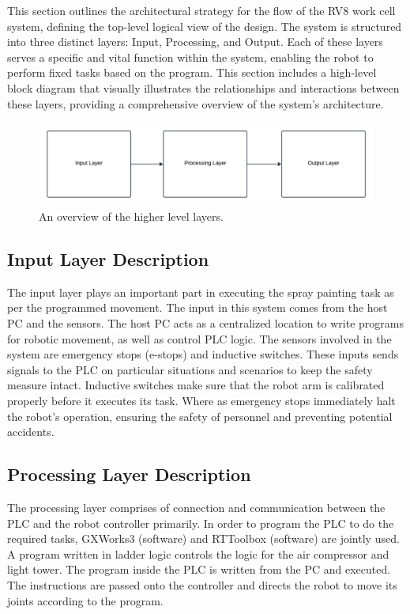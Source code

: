 This section outlines the architectural strategy for the flow of the RV8 work cell system, defining the top-level logical view of the design. The system is structured into three distinct layers: Input, Processing, and Output. Each of these layers serves a specific and vital function within the system, enabling the robot to perform fixed tasks based on the program. This section includes a high-level block diagram that visually illustrates the relationships and interactions between these layers, providing a comprehensive overview of the system's architecture.

\begin{figure}[h!]
	\centering
 	\includegraphics[width=1\textwidth]{images/sys_overview.png}
 \caption{An overview of the higher level layers.}
\end{figure}

\subsection{Input Layer Description}
The input layer plays an important part in executing the spray painting task as per the programmed movement. The input in this system comes from the host PC and the sensors. The host PC acts as a centralized location to write programs for robotic movement, as well as control PLC logic. The sensors involved in the system are emergency stops (e-stops) and inductive switches. These inputs sends signals to the PLC on particular situations and scenarios to keep the safety measure intact. Inductive switches make sure that the robot arm is calibrated properly before it executes its task. Where as emergency stops immediately halt the robot's operation, ensuring the safety of personnel and preventing potential accidents.

\subsection{Processing Layer Description}
The processing layer comprises of connection and communication between the PLC and the robot controller primarily. In order to program the PLC to do the required tasks, GXWorks3 (software) and RTToolbox (software) are jointly used. A program written in ladder logic controls the logic for the air compressor and light tower. The program inside the PLC is written from the PC and executed. The instructions are passed onto the controller and directs the robot to move its joints according to the program. 


